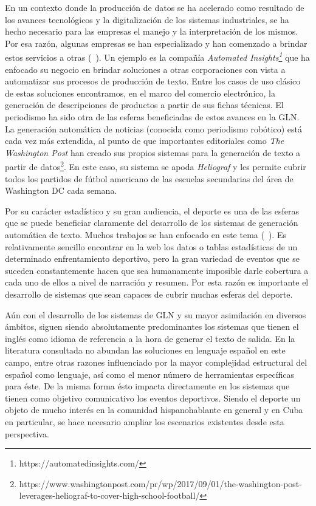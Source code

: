     En un contexto donde la producción de datos se ha acelerado como resultado de los avances tecnológicos y la digitalización de los sistemas industriales, se ha hecho necesario para 
las empresas el manejo y la interpretación de los mismos. Por esa raz\'on, algunas empresas se han especializado y han comenzado a brindar estos servicios a otras (~\cite{dale2020natural}). Un ejemplo es la compañía 
\textit{Automated Insights\footnote[1]{https://automatedinsights.com/}} que ha enfocado su negocio en brindar soluciones a otras corporaciones con vista a automatizar sus 
procesos de producción de texto. Entre los casos de uso clásico de estas soluciones encontramos, en el marco del comercio electr\'onico, la generación de descripciones de 
productos a partir de sus fichas técnicas. El periodismo ha sido otra de las esferas beneficiadas de estos avances en la GLN. La generación automática de noticias (conocida como 
periodismo robótico) está cada vez más extendida, al punto de que importantes editoriales como \textit{The Washington Post} han creado sus propios sistemas para la generación de 
texto a partir de datos\footnote[2]{https://www.washingtonpost.com/pr/wp/2017/09/01/the-washington-post-leverages-heliograf-to-cover-high-school-football/}. 
En este caso, su sistema se apoda \textit{Heliograf} y les permite cubrir todos los partidos de fútbol americano de las escuelas secundarias del área de Washington DC 
cada semana.

    Por su carácter estadístico y su gran audiencia, el deporte es una de las esferas que se puede beneficiar claramente del desarrollo de los sistemas 
de generación automática de texto. Muchos trabajos se han enfocado en este tema (~\cite{theune2001data, van2017pass, gunasiri2021automated,}).  Es relativamente sencillo encontrar en la web 
los datos o tablas estadísticas de un determinado enfrentamiento deportivo, pero la gran variedad de eventos que se suceden constantemente hacen 
que sea humanamente imposible darle cobertura a cada uno de ellos a nivel de narración y resumen. Por esta razón es importante el desarrollo 
de sistemas que sean capaces de cubrir muchas esferas del deporte.



    Aún con el desarrollo de los sistemas de GLN y su mayor asimilación en diversos ámbitos, siguen siendo absolutamente predominantes los 
sistemas que tienen el inglés como idioma de referencia a la hora de generar el texto de salida. En la literatura consultada no abundan las soluciones 
en lenguaje español en este campo, entre otras razones influenciado por la mayor complejidad estructural del español como lenguaje, así como el menor número 
de herramientas específicas para éste. De la misma forma ésto impacta directamente en los sistemas que tienen como objetivo comunicativo los eventos deportivos. Siendo el deporte un objeto de mucho interés en la 
comunidad hispanohablante en general y en Cuba en particular, se hace necesario ampliar los escenarios existentes desde esta perspectiva.


